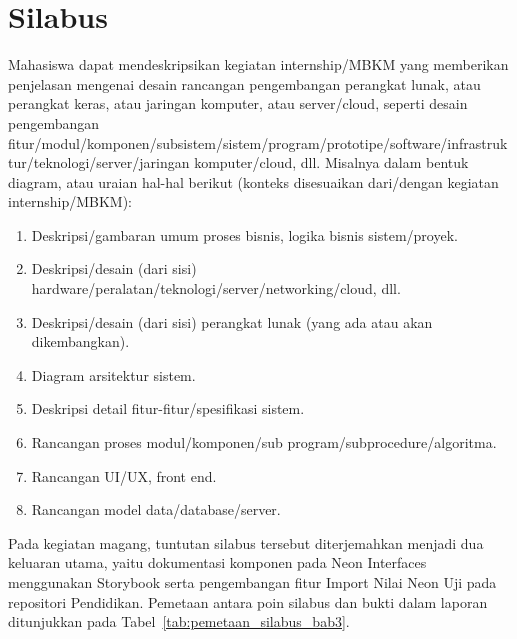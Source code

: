 \section{Silabus}
Mahasiswa dapat mendeskripsikan kegiatan internship\slash MBKM yang memberikan penjelasan mengenai desain rancangan pengembangan perangkat lunak, atau perangkat keras, atau jaringan komputer, atau server\slash cloud, seperti desain pengembangan fitur\slash modul\slash komponen\slash subsistem\slash sistem\slash program\slash prototipe\slash software\slash infrastruktur\slash teknologi\slash server\slash jaringan komputer\slash cloud, dll. Misalnya dalam bentuk diagram, atau uraian hal-hal berikut (konteks disesuaikan dari\slash dengan kegiatan internship\slash MBKM):
\begin{enumerate}
	\item Deskripsi\slash gambaran umum proses bisnis, logika bisnis sistem\slash proyek.
	\item Deskripsi\slash desain (dari sisi) hardware\slash peralatan\slash teknologi\slash server\slash networking\slash cloud, dll.
	\item Deskripsi\slash desain (dari sisi) perangkat lunak (yang ada atau akan dikembangkan).
	\item Diagram arsitektur sistem.
	\item Deskripsi detail fitur-fitur\slash spesifikasi sistem.
	\item Rancangan proses modul\slash komponen\slash sub program\slash subprocedure\slash algoritma.
	\item Rancangan UI\slash UX, front end.
	\item Rancangan model data\slash database\slash server.
\end{enumerate}
Pada kegiatan magang, tuntutan silabus tersebut diterjemahkan menjadi dua keluaran utama, yaitu dokumentasi komponen pada Neon Interfaces menggunakan Storybook serta pengembangan fitur Import Nilai Neon Uji pada repositori Pendidikan. Pemetaan antara poin silabus dan bukti dalam laporan ditunjukkan pada Tabel~\ref{tab:pemetaan_silabus_bab3}.

